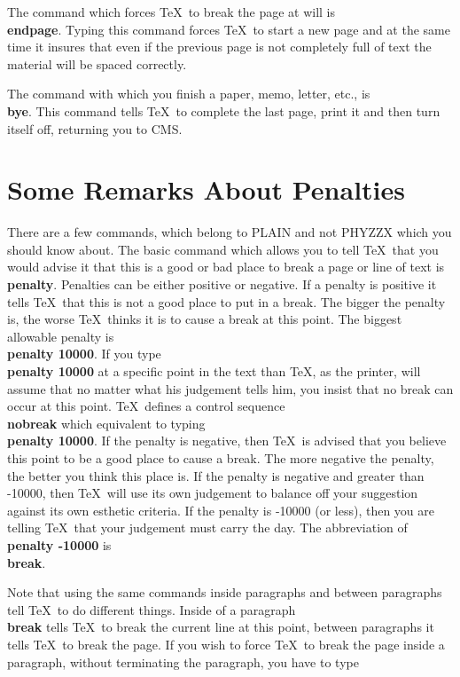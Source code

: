 The command which forces \TeX\ to break the page at will
is {\bf \\endpage}.
Typing this command forces \TeX\ to start a new page
and at the same time it insures that even if the previous page
is not completely full of text the material will be spaced correctly.
 
The command with which you finish a paper, memo, letter, etc.,
is {\bf \\bye}.
This command tells \TeX\ to complete the last page, print it and
then turn itself off, returning you to CMS.
 
\section{Some Remarks About Penalties}
 
There are a few commands, which belong to PLAIN and not PHYZZX
which you should know about.
The basic command which allows you to tell \TeX\ that you
would advise it that this is a good or bad place to break
a page or line of text is {\bf \\penalty}.
Penalties can be either positive or negative.
If a penalty is positive it tells \TeX\ that this is not a good
place to put in a break.
The bigger the penalty is, the worse \TeX\ thinks it is to cause
a break at this point.
The biggest allowable penalty is {\bf \\penalty 10000}.
If you type {\bf \\penalty 10000} at a specific point in the text
than \TeX , as the printer, will assume that no matter what his
judgement tells him, you insist that no break can occur at this
point.
\TeX\ defines a control sequence {\bf \\nobreak} which equivalent
to typing {\bf \\penalty 10000}.
If the penalty is negative, then \TeX\ is advised that you
believe this point to be a good place to cause a break.
The more negative the penalty, the better you think this place is.
If the penalty is negative and greater than
-10000, then \TeX\ will
use its own judgement to balance off your suggestion against its
own esthetic criteria.
If the penalty is -10000 (or less), then you are telling \TeX\
that your judgement must carry the day.
The abbreviation of {\bf \\penalty -10000} is {\bf \\break}.
 
Note that using the
same commands inside paragraphs and between paragraphs
tell \TeX\ to do different things.
Inside of a paragraph {\bf \\break} tells \TeX\ to break the
current line at this point, between paragraphs it tells \TeX\
to break the page.
If you wish to force \TeX\ to break the page inside a paragraph,
without terminating the paragraph, you have to type
\tc{\\vadjust\\break}
 
